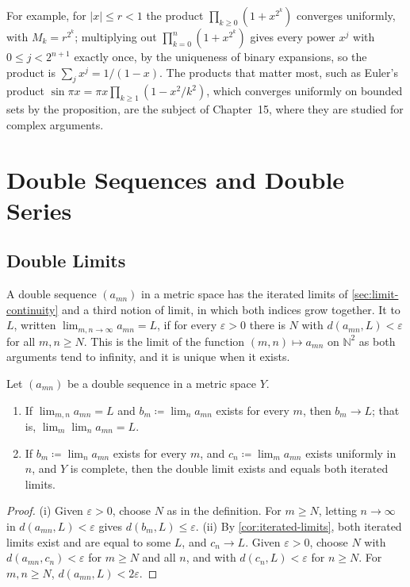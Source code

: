 For example, for $|x|\le r<1$ the product $\prod_{k\ge0}(1+x^{2^k})$ converges uniformly, with $M_k=r^{2^k}$; multiplying out $\prod_{k=0}^n(1+x^{2^k})$ gives every power $x^j$ with $0\le j<2^{n+1}$ exactly once, by the uniqueness of binary expansions, so the product is $\sum_jx^j=1/(1-x)$. The products that matter most, such as Euler's product $\sin\pi x=\pi x\prod_{k\ge1}(1-x^2/k^2)$, which converges uniformly on bounded sets by the proposition, are the subject of Chapter~15, where they are studied for complex arguments.

\section{Double Sequences and Double Series}
\label{sec:double-series}

\subsection{Double Limits}

A double sequence $(a_{mn})$ in a metric space has the iterated limits of \cref{sec:limit-continuity} and a third notion of limit, in which both indices grow together. It  to $L$, written $\lim_{m,n\to\infty}a_{mn}=L$, if for every $\varepsilon>0$ there is $N$ with $d(a_{mn},L)<\varepsilon$ for all $m,n\ge N$. This is the limit of the function $(m,n)\mapsto a_{mn}$ on $\mathbb N^2$ as both arguments tend to infinity, and it is unique when it exists.

\begin{proposition}
\label{prop:double-limits}
Let $(a_{mn})$ be a double sequence in a metric space $Y$.
\begin{enumerate}
\item If $\lim_{m,n}a_{mn}=L$ and $b_m\coloneqq\lim_na_{mn}$ exists for every $m$, then $b_m\to L$; that is, $\lim_m\lim_na_{mn}=L$.
\item If $b_m\coloneqq\lim_na_{mn}$ exists for every $m$, and $c_n\coloneqq\lim_ma_{mn}$ exists uniformly in $n$, and $Y$ is complete, then the double limit exists and equals both iterated limits.
\end{enumerate}
\end{proposition}

\begin{proof}
(i) Given $\varepsilon>0$, choose $N$ as in the definition. For $m\ge N$, letting $n\to\infty$ in $d(a_{mn},L)<\varepsilon$ gives $d(b_m,L)\le\varepsilon$. (ii) By \cref{cor:iterated-limits}, both iterated limits exist and are equal to some $L$, and $c_n\to L$. Given $\varepsilon>0$, choose $N$ with $d(a_{mn},c_n)<\varepsilon$ for $m\ge N$ and all $n$, and with $d(c_n,L)<\varepsilon$ for $n\ge N$. For $m,n\ge N$, $d(a_{mn},L)<2\varepsilon$.
\end{proof}

